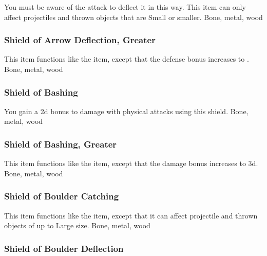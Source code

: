 You must be aware of the attack to deflect it in this way.
This item can only affect projectiles and thrown objects that are Small or smaller.
 
 Bone, metal, wood
\lowercase{\hypertarget{item:Shield of Arrow Deflection, Greater}{}}\label{item:Shield of Arrow Deflection, Greater}
\hypertarget{item:Shield of Arrow Deflection, Greater}{\subsubsection{Shield of Arrow Deflection, Greater\hfill{}}}
This item functions like the  item, except that the defense bonus increases to .
 
 Bone, metal, wood
\lowercase{\hypertarget{item:Shield of Bashing}{}}\label{item:Shield of Bashing}
\hypertarget{item:Shield of Bashing}{\subsubsection{Shield of Bashing\hfill{}}}
You gain a \plus2d bonus to damage with physical attacks using this shield.
 
 Bone, metal, wood
\lowercase{\hypertarget{item:Shield of Bashing, Greater}{}}\label{item:Shield of Bashing, Greater}
\hypertarget{item:Shield of Bashing, Greater}{\subsubsection{Shield of Bashing, Greater\hfill{}}}
This item functions like the  item, except that the damage bonus increases to \plus3d.
 
 Bone, metal, wood
\lowercase{\hypertarget{item:Shield of Boulder Catching}{}}\label{item:Shield of Boulder Catching}
\hypertarget{item:Shield of Boulder Catching}{\subsubsection{Shield of Boulder Catching\hfill{}}}
This item functions like the  item, except that it can affect projectile and thrown objects of up to Large size.
 
 Bone, metal, wood
\lowercase{\hypertarget{item:Shield of Boulder Deflection}{}}\label{item:Shield of Boulder Deflection}
\hypertarget{item:Shield of Boulder Deflection}{\subsubsection{Shield of Boulder Deflection\hfill{}}}
